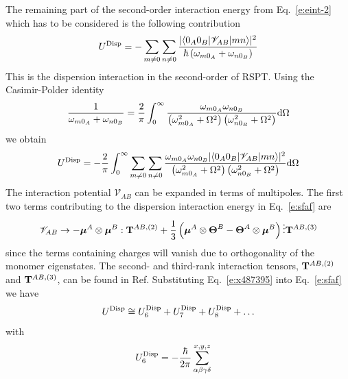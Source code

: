 \documentclass[a4paper,titlepage,twoside,fleqn,12pt]{book}
\newcommand{\BM}[1]{\ensuremath{\mbox{\boldmath${#1}$}}}
\begin{document}
\begin{refsection}
The remaining part of the second\hyp{}order interaction
energy from Eq.~\eqref{e:eint-2} which has to be considered
is the following contribution
%
\begin{equation} \label{e:eint-2-disp}
U^{\rm Disp} = - \sum_{m\ne 0} \sum_{n\ne 0} \frac{
\lvert \langle 0_A0_B \lvert \mathscr{V}_{AB} \rvert mn \rangle \rvert^2
}{\hbar \left( \omega_{m0_A} + \omega_{n0_B}\right)}
\end{equation}
%
This is the dispersion interaction in the second\hyp{}order of RSPT.
Using the Casimir-Polder identity
%
\begin{equation} \label{e:Casimir-Polder}
\frac{1}{\omega_{m0_A}+\omega_{n0_B}} =\frac{2}{\pi} \int_0^{\infty} 
\frac{\omega_{m0_A}\omega_{n0_B}}
{\left(\omega_{m0_A}^2+\Omega^2\right)\left(\omega_{n0_B}^2+\Omega^2\right)} {\rm d}\Omega
\end{equation}
%
we obtain
%
\begin{equation} \label{e:sfaf}
U^{\rm Disp} =-\frac{2}{\pi}\int_0^{\infty} \sum_{m\ne 0} \sum_{n\ne 0}
\frac{\omega_{m0_A}\omega_{n0_B}
\lvert \langle 0_A0_B \lvert \mathscr{V}_{AB} \rvert mn \rangle \rvert^2
}
{\left(\omega_{m0_A}^2+\Omega^2\right)\left(\omega_{n0_B}^2+\Omega^2\right)} {\rm d}\Omega
\end{equation}
%
The interaction potential $\mathscr{V}_{AB}$ can be expanded in terms of multipoles. 
The first two terms contributing to the dispersion interaction energy 
in Eq.~\eqref{e:sfaf} are\citep{Smith.Ruedenberg.Gordon.Slipchenko.JCP.2012}
%
\begin{equation} \label{e:x487395}
\mathscr{V}_{AB} \rightarrow
- {\BM \mu}^A \otimes {\BM \mu}^B : {\bf T}^{AB,(2)} + \frac{1}{3} 
\left( 
 {\BM \mu}^A \otimes {\BM \Theta}^B - {\BM \Theta}^A \otimes {\BM \mu}^B
\right) \vdots {\bf T}^{AB,(3)}
\end{equation}
%
since the terms containing charges will vanish due to orthogonality 
of the monomer eigenstates. The second- and third-rank interaction tensors,
${\bf T}^{AB,(2)}$ and ${\bf T}^{AB,(3)}$, 
can be found in Ref.\citep{Stone.TheTheoryOfIntermolecularForces.1996}
Substituting Eq.~\eqref{e:x487395} into Eq.~\eqref{e:sfaf} we have
%
\begin{equation}
 U^{\rm Disp} \cong  U^{\rm Disp}_6 + U^{\rm Disp}_7 + U^{\rm Disp}_8 + \ldots
\end{equation}
%
with
%
\begin{subequations} \label{e:udisp-6-7-8}
 \begin{align}
  U^{\rm Disp}_6 &= - \frac{\hbar}{2\pi} \sum_{\alpha\beta\gamma\delta}^{x,y,z}

\end{align}
\end{subequations}
\end{refsection}
\end{document}
